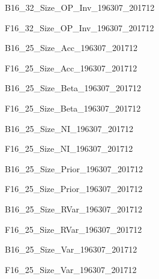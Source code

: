 \begin{landscape}
{B16_32_Size_OP_Inv_196307_201712}
\end{landscape}

\begin{landscape}
{F16_32_Size_OP_Inv_196307_201712}
\end{landscape}

{B16_25_Size_Acc_196307_201712}

{F16_25_Size_Acc_196307_201712}

{B16_25_Size_Beta_196307_201712}

{F16_25_Size_Beta_196307_201712}

{B16_25_Size_NI_196307_201712}

{F16_25_Size_NI_196307_201712}

{B16_25_Size_Prior_196307_201712}

{F16_25_Size_Prior_196307_201712}

{B16_25_Size_RVar_196307_201712}

{F16_25_Size_RVar_196307_201712}

{B16_25_Size_Var_196307_201712}

{F16_25_Size_Var_196307_201712}
